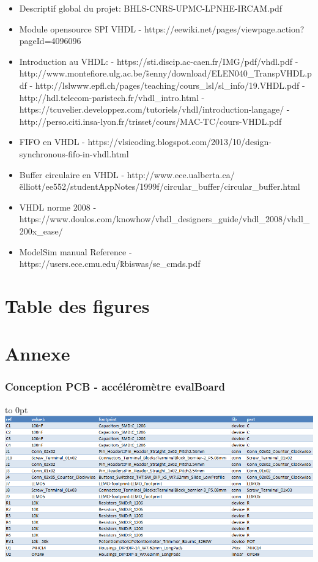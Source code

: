 \documentclass[french,a4paper,12pt]{report}
\begin{document}
	\begin{itemize}
		\item Descriptif global du projet: BHLS-CNRS-UPMC-LPNHE-IRCAM.pdf
		\item Module opensource SPI VHDL - https://eewiki.net/pages/viewpage.action?pageId=4096096
		\item Introduction au VHDL:
						- https://sti.discip.ac-caen.fr/IMG/pdf/vhdl.pdf
						- http://www.montefiore.ulg.ac.be/\~senny/download/ELEN040\_TranspVHDL.pdf
						- http://lslwww.epfl.ch/pages/teaching/cours\_lsl/sl\_info/19.VHDL.pdf
						- http://hdl.telecom-paristech.fr/vhdl\_intro.html
						- https://tcuvelier.developpez.com/tutoriels/vhdl/introduction-langage/
						- http://perso.citi.insa-lyon.fr/trisset/cours/MAC-TC/cours-VHDL.pdf
		\item FIFO en VHDL - https://vlsicoding.blogspot.com/2013/10/design-synchronous-fifo-in-vhdl.html
		\item Buffer circulaire en VHDL - http://www.ece.ualberta.ca/\~elliott/ee552/studentAppNotes/1999f/circular\_buffer/circular\_buffer.html
		\item VHDL norme 2008 - https://www.doulos.com/knowhow/vhdl\_designers\_guide/vhdl\_2008/vhdl\_200x\_ease/
		\item ModelSim manual Reference - https://users.ece.cmu.edu/\~kbiswas/se\_cmds.pdf
	\end{itemize}


\part{Table des figures}

	\listoffigures
	
\part{Annexe}

	\section{Conception PCB - accéléromètre evalBoard}
		
			
		
		
		
			
		\hfill\hbox to 0pt{\hss\includegraphics[width=15cm]{Liste_compos.png}\hss}\hfill\null\newline
			
\end{document}
